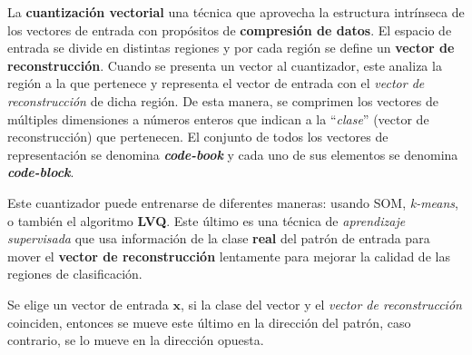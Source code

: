 \documentclass[10pt,a4paper]{article}
\begin{document}
La \textbf{cuantización vectorial} una técnica que aprovecha la estructura intrínseca de los vectores de entrada con propósitos de \textbf{compresión de datos}. El espacio de entrada se divide en distintas regiones y por cada región se define un \textbf{vector de reconstrucción}. Cuando se presenta un vector al cuantizador, este analiza la región a la que pertenece y representa el vector de entrada con el \textit{vector de reconstrucción} de dicha región. De esta manera, se comprimen los vectores de múltiples dimensiones a números enteros que indican a la ``\textit{clase}'' (vector de reconstrucción) que pertenecen. El conjunto de todos los vectores de representación se denomina \textbf{\textit{code-book}} y cada uno de sus elementos se denomina \textbf{\textit{code-block}}.

Este cuantizador puede entrenarse de diferentes maneras: usando SOM, \textit{k-means}, o también el algoritmo \textbf{LVQ}. Este último es una técnica de \textit{aprendizaje supervisada} que usa información de la clase \textbf{real} del patrón de entrada para mover el \textbf{vector de reconstrucción} lentamente para mejorar la calidad de las regiones de clasificación.

Se elige un vector de entrada $\mathbf{x}$, si la clase del vector y el \textit{vector de reconstrucción} coinciden, entonces se mueve este último en la dirección del patrón, caso contrario, se lo mueve en la dirección opuesta.
\end{document}
